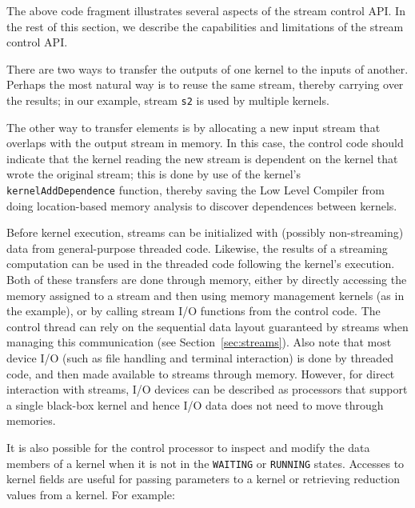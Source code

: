 The above code fragment illustrates several aspects of the stream
control API.  In the rest of this section, we describe the
capabilities and limitations of the stream control API.


There are two ways to transfer the outputs of one kernel to the inputs
of another.  Perhaps the most natural way is to reuse the same stream,
thereby carrying over the results; in our example, stream {\tt s2} is
used by multiple kernels.

The other way to transfer elements is by allocating a new input stream
that overlaps with the output stream in memory.  In this case, the
control code should indicate that the kernel reading the new stream is
dependent on the kernel that wrote the original stream; this is done
by use of the kernel's {\tt kernelAddDependence} function, thereby
saving the Low Level Compiler from doing location-based memory
analysis to discover dependences between kernels.


Before kernel execution, streams can be initialized with (possibly
non-streaming) data from general-purpose threaded code.  Likewise, the
results of a streaming computation can be used in the threaded code
following the kernel's execution.  Both of these transfers are done
through memory, either by directly accessing the memory assigned to a
stream and then using memory management kernels (as in the example),
or by calling stream I/O functions from the control code.  The control
thread can rely on the sequential data layout guaranteed by streams
when managing this communication (see Section~\ref{sec:streams}).
Also note that most device I/O (such as file handling and terminal
interaction) is done by threaded code, and then made available to
streams through memory.  However, for direct interaction with streams,
I/O devices can be described as processors that support a single
black-box kernel and hence I/O data does not need to move through
memories.

It is also possible for the control processor to inspect and modify
the data members of a kernel when it is not in the {\tt WAITING} or
{\tt RUNNING} states. Accesses to kernel fields are useful for passing
parameters to a kernel or retrieving reduction values from a kernel.
For example:

